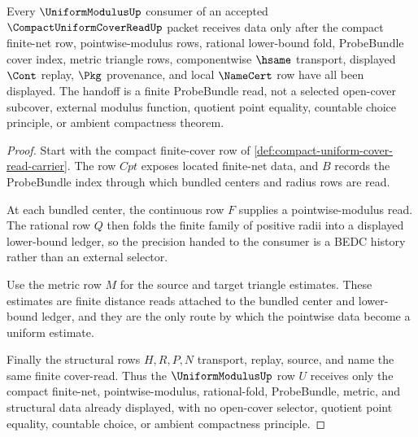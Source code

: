 \begin{theorem}
\label{thm:compact-uniform-cover-read-uniform-modulus-handoff}
Every $\UniformModulusUp$ consumer of an accepted $\CompactUniformCoverReadUp$ packet receives data only after the compact finite-net row, pointwise-modulus rows, rational lower-bound fold, ProbeBundle cover index, metric triangle rows, componentwise $\hsame$ transport, displayed $\Cont$ replay, $\Pkg$ provenance, and local $\NameCert$ row have all been displayed. The handoff is a finite ProbeBundle read, not a selected open-cover subcover, external modulus function, quotient point equality, countable choice principle, or ambient compactness theorem.
\end{theorem}
\begin{proof}
Start with the compact finite-cover row of \autoref{def:compact-uniform-cover-read-carrier}. The row $Cpt$ exposes located finite-net data, and $B$ records the ProbeBundle index through which bundled centers and radius rows are read.

At each bundled center, the continuous row $F$ supplies a pointwise-modulus read. The rational row $Q$ then folds the finite family of positive radii into a displayed lower-bound ledger, so the precision handed to the consumer is a BEDC history rather than an external selector.

Use the metric row $M$ for the source and target triangle estimates. These estimates are finite distance reads attached to the bundled center and lower-bound ledger, and they are the only route by which the pointwise data become a uniform estimate.

Finally the structural rows $H,R,P,N$ transport, replay, source, and name the same finite cover-read. Thus the $\UniformModulusUp$ row $U$ receives only the compact finite-net, pointwise-modulus, rational-fold, ProbeBundle, metric, and structural data already displayed, with no open-cover selector, quotient point equality, countable choice, or ambient compactness principle.
\end{proof}

